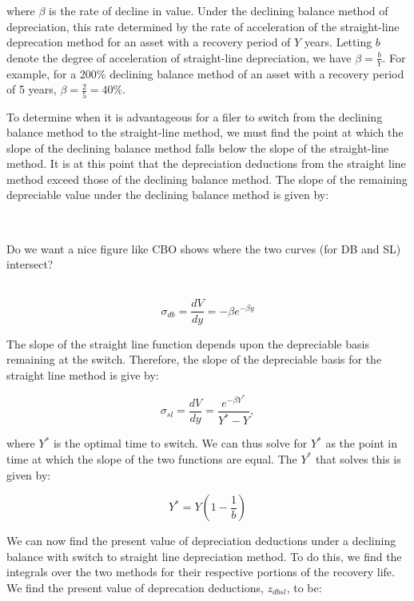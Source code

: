\documentclass[article,11pt,letterpaper,fleqn]{article}
\theoremstyle{definition}
\numberwithin{equation}{section}
\begin{document}
\noindent\noindent where $\beta$ is the rate of decline in value.  Under the declining balance method of depreciation, this rate determined by the rate of acceleration of the straight-line deprecation method for an asset with a recovery period of $Y$ years.  Letting $b$ denote the degree of acceleration of straight-line depreciation, we have $\beta=\frac{b}{Y}$.  For example, for a 200\% declining balance method of an asset with a recovery period of 5 years, $\beta =\frac{2}{5}=40\%$.

To determine when it is advantageous for a filer to switch from the declining balance method to the straight-line method, we must find the point at which the slope of the declining balance method falls below the slope of the straight-line method.  It is at this point that the depreciation deductions from the straight line method exceed those of the declining balance method.  The slope of the remaining depreciable value under the declining balance method is given by:

\ \\
\begin{center}
Do we want a nice figure like CBO shows where the two curves (for DB and SL) intersect?
\end{center}
\ \\

\begin{equation}
\sigma_{db} = \frac{dV}{dy}=-\beta e^{-\beta y}
\end{equation}

\noindent\noindent The slope of the straight line function depends upon the depreciable basis remaining at the switch.  Therefore, the slope of the depreciable basis for the straight line method is give by:

\begin{equation}
\sigma_{sl} =  \frac{dV}{dy}=\frac{e^{-\beta Y^{*}}}{Y^{*}-Y},
\end{equation}

\noindent\noindent where $Y^{*}$ is the optimal time to switch. We can thus solve for $Y^{*}$ as the point in time at which the slope of the two functions are equal.  The $Y^{*}$ that solves this is given by:

\begin{equation}
Y^{*}=Y\left(1-\frac{1}{b}\right)
\end{equation}

We can now find the present value of depreciation deductions under a declining balance with switch to straight line depreciation method.  To do this, we find the integrals over the two methods for their respective portions of the recovery life.  We find the present value of deprecation deductions, $z_{dbsl}$, to be:
\end{document}
